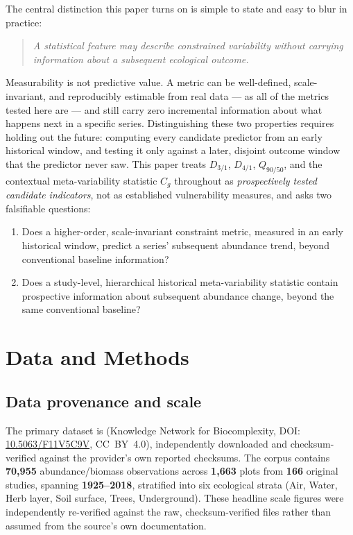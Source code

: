 \documentclass[11pt]{article}
\newcommand{\Dthreeone}{D_{3/1}}
\newcommand{\Dfourone}{D_{4/1}}
\newcommand{\Qninefifty}{Q_{90/50}}
\newcommand{\Cg}{C_g}
\begin{document}
The central distinction this paper turns on is simple to state and easy
to blur in practice:

\begin{quote}
\emph{A statistical feature may describe constrained variability without
carrying information about a subsequent ecological outcome.}
\end{quote}

Measurability is not predictive value. A metric can be well-defined,
scale-invariant, and reproducibly estimable from real data --- as all of
the metrics tested here are --- and still carry zero incremental
information about what happens next in a specific series. Distinguishing
these two properties requires holding out the future: computing every
candidate predictor from an early historical window, and testing it only
against a later, disjoint outcome window that the predictor never saw.
This paper treats $\Dthreeone$, $\Dfourone$, $\Qninefifty$, and the
contextual meta-variability statistic $\Cg$ throughout as
\emph{prospectively tested candidate indicators}, not as established
vulnerability measures, and asks two falsifiable questions:

\begin{enumerate}[label=(\arabic*)]
\item Does a higher-order, scale-invariant constraint metric, measured in
an early historical window, predict a series' subsequent abundance trend,
beyond conventional baseline information?
\item Does a study-level, hierarchical historical meta-variability
statistic contain prospective information about subsequent abundance
change, beyond the same conventional baseline?
\end{enumerate}

\section{Data and Methods}

\subsection{Data provenance and scale}

The primary dataset is \citet{vanklink2020} (Knowledge Network for
Biocomplexity, DOI: \href{https://doi.org/10.5063/F11V5C9V}{10.5063/F11V5C9V},
CC~BY~4.0), independently downloaded and checksum-verified against the
provider's own reported checksums. The corpus contains \textbf{70{,}955}
abundance/biomass observations across \textbf{1{,}663} plots from
\textbf{166} original studies, spanning \textbf{1925--2018}, stratified
into six ecological strata (Air, Water, Herb layer, Soil surface, Trees,
Underground). These headline scale figures were independently
re-verified against the raw, checksum-verified files rather than assumed
from the source's own documentation.
\end{document}

